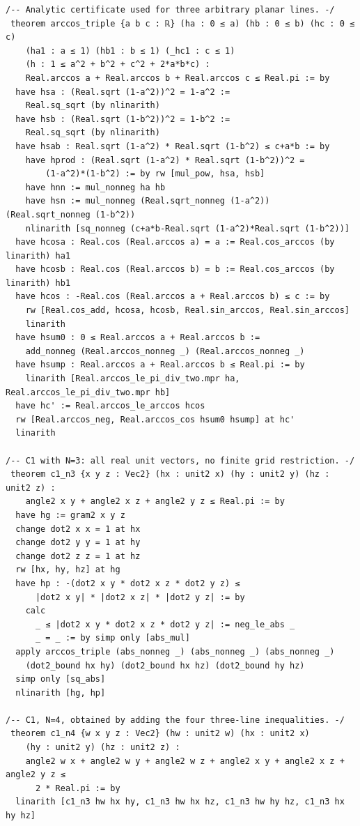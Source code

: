 \documentclass[11pt,a4paper]{article}
\begin{document}
\begin{Verbatim}[breaklines,breakanywhere,fontsize=\footnotesize]
/-- Analytic certificate used for three arbitrary planar lines. -/
 theorem arccos_triple {a b c : ℝ} (ha : 0 ≤ a) (hb : 0 ≤ b) (hc : 0 ≤ c)
    (ha1 : a ≤ 1) (hb1 : b ≤ 1) (_hc1 : c ≤ 1)
    (h : 1 ≤ a^2 + b^2 + c^2 + 2*a*b*c) :
    Real.arccos a + Real.arccos b + Real.arccos c ≤ Real.pi := by
  have hsa : (Real.sqrt (1-a^2))^2 = 1-a^2 :=
    Real.sq_sqrt (by nlinarith)
  have hsb : (Real.sqrt (1-b^2))^2 = 1-b^2 :=
    Real.sq_sqrt (by nlinarith)
  have hsab : Real.sqrt (1-a^2) * Real.sqrt (1-b^2) ≤ c+a*b := by
    have hprod : (Real.sqrt (1-a^2) * Real.sqrt (1-b^2))^2 =
        (1-a^2)*(1-b^2) := by rw [mul_pow, hsa, hsb]
    have hnn := mul_nonneg ha hb
    have hsn := mul_nonneg (Real.sqrt_nonneg (1-a^2)) (Real.sqrt_nonneg (1-b^2))
    nlinarith [sq_nonneg (c+a*b-Real.sqrt (1-a^2)*Real.sqrt (1-b^2))]
  have hcosa : Real.cos (Real.arccos a) = a := Real.cos_arccos (by linarith) ha1
  have hcosb : Real.cos (Real.arccos b) = b := Real.cos_arccos (by linarith) hb1
  have hcos : -Real.cos (Real.arccos a + Real.arccos b) ≤ c := by
    rw [Real.cos_add, hcosa, hcosb, Real.sin_arccos, Real.sin_arccos]
    linarith
  have hsum0 : 0 ≤ Real.arccos a + Real.arccos b :=
    add_nonneg (Real.arccos_nonneg _) (Real.arccos_nonneg _)
  have hsump : Real.arccos a + Real.arccos b ≤ Real.pi := by
    linarith [Real.arccos_le_pi_div_two.mpr ha, Real.arccos_le_pi_div_two.mpr hb]
  have hc' := Real.arccos_le_arccos hcos
  rw [Real.arccos_neg, Real.arccos_cos hsum0 hsump] at hc'
  linarith

/-- C1 with N=3: all real unit vectors, no finite grid restriction. -/
 theorem c1_n3 {x y z : Vec2} (hx : unit2 x) (hy : unit2 y) (hz : unit2 z) :
    angle2 x y + angle2 x z + angle2 y z ≤ Real.pi := by
  have hg := gram2 x y z
  change dot2 x x = 1 at hx
  change dot2 y y = 1 at hy
  change dot2 z z = 1 at hz
  rw [hx, hy, hz] at hg
  have hp : -(dot2 x y * dot2 x z * dot2 y z) ≤
      |dot2 x y| * |dot2 x z| * |dot2 y z| := by
    calc
      _ ≤ |dot2 x y * dot2 x z * dot2 y z| := neg_le_abs _
      _ = _ := by simp only [abs_mul]
  apply arccos_triple (abs_nonneg _) (abs_nonneg _) (abs_nonneg _)
    (dot2_bound hx hy) (dot2_bound hx hz) (dot2_bound hy hz)
  simp only [sq_abs]
  nlinarith [hg, hp]

/-- C1, N=4, obtained by adding the four three-line inequalities. -/
 theorem c1_n4 {w x y z : Vec2} (hw : unit2 w) (hx : unit2 x)
    (hy : unit2 y) (hz : unit2 z) :
    angle2 w x + angle2 w y + angle2 w z + angle2 x y + angle2 x z + angle2 y z ≤
      2 * Real.pi := by
  linarith [c1_n3 hw hx hy, c1_n3 hw hx hz, c1_n3 hw hy hz, c1_n3 hx hy hz]


\end{Verbatim}
\end{document}
